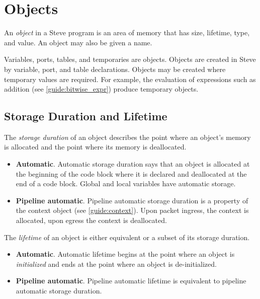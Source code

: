 \section{Objects} \label{guide:object}

An \textit{object} in a Steve program is an area of memory that has size, lifetime, type, and value. An object may also be given a name.

Variables, ports, tables, and temporaries are objects. Objects are created in Steve by variable, port, and table declarations. Objects may be created where temporary values are required. For example, the evaluation of expressions such as addition (see \ref{guide:bitwise_expr}) produce temporary objects.

\subsection{Storage Duration and Lifetime} \label{guide:storage}

The \textit{storage duration} of an object describes the point where an object's memory is allocated and the point where its memory is deallocated.

\begin{itemize}
\item \textbf{Automatic}. Automatic storage duration says that an object is allocated at the beginning of the code block where it is declared and deallocated at the end of a code block. Global and local variables have automatic storage.

\item \textbf{Pipeline automatic}. Pipeline automatic storage duration is a property of the context object (see \ref{guide:context}). Upon packet ingress, the context is allocated, upon egress the context is deallocated.
\end{itemize}

The \textit{lifetime} of an object is either equivalent or a subset of its storage duration.

\begin{itemize}
\item \textbf{Automatic}. Automatic lifetime begins at the point where an object is \textit{initialized} and ends at the point where an object is de-initialized.

\item \textbf{Pipeline automatic}. Pipeline automatic lifetime is equivalent to pipeline automatic storage duration.
\end{itemize}

